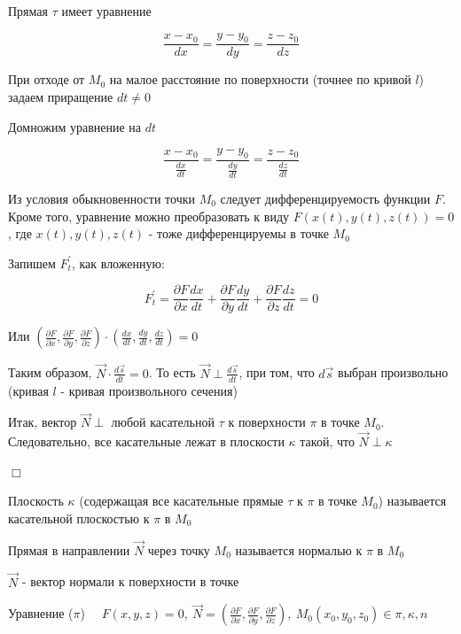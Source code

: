 \documentclass[12pt]{article}
\begin{document}
    Прямая $\tau$ имеет уравнение

    \[\frac{x - x_0}{dx} = \frac{y - y_0}{dy} = \frac{z - z_0}{dz}\]

    При отходе от $M_0$ на малое расстояние по поверхности (точнее по кривой $l$) задаем приращение $dt \neq 0$

    Домножим уравнение на $dt$

    \[\frac{x - x_0}{\frac{dx}{dt}} = \frac{y - y_0}{\frac{dy}{dt}} = \frac{z - z_0}{\frac{dz}{dt}}\]

    Из условия обыкновенности точки $M_0$ следует дифференцируемость функции $F$.
    Кроме того, уравнение можно преобразовать к виду $F(x(t), y(t), z(t)) = 0$, где $x(t), y(t), z(t)$ - тоже дифференцируемы в точке $M_0$

    Запишем $F^\prime_t$, как вложенную:

    \[F^\prime_t = \frac{\partial F}{\partial x}\frac{dx}{dt} + \frac{\partial F}{\partial y}\frac{dy}{dt} + \frac{\partial F}{\partial z}\frac{dz}{dt} = 0\]

    Или $\left(\frac{\partial F}{\partial x}, \frac{\partial F}{\partial y}, \frac{\partial F}{\partial z}\right) \cdot \left(\frac{dx}{dt}, \frac{dy}{dt}, \frac{dz}{dt}\right) = 0$

    Таким образом, $\overrightarrow{N} \cdot \frac{d\overrightarrow{s}}{dt} = 0$. То есть $\overrightarrow{N} \perp \frac{d\overrightarrow{s}}{dt}$, при том, что $d\overrightarrow{s}$ выбран произвольно (кривая $l$ - кривая произвольного сечения)

    Итак, вектор $\overrightarrow{N} \perp$ любой касательной $\tau$ к поверхности $\pi$ в точке $M_0$.
    Следовательно, все касательные лежат в плоскости $\kappa$ такой, что $\overrightarrow{N} \perp \kappa$

    $\Box$

    \hypertarget{tangentplanetosurface}{}

    \Def Плоскость $\kappa$ (содержащая все касательные прямые $\tau$ к $\pi$ в точке $M_0$) называется касательной плоскостью к $\pi$ в $M_0$

    \Def Прямая в направлении $\overrightarrow{N}$ через точку $M_0$ называется нормалью к $\pi$ в $M_0$

    $\overrightarrow{N}$ - вектор нормали к поверхности в точке

    Уравнение ($\pi$) $\quad F(x, y, z) = 0, \ \overrightarrow{N} = \left(\frac{\partial F}{\partial x}, \frac{\partial F}{\partial y}, \frac{\partial F}{\partial z}\right), \ M_0(x_0, y_0, z_0) \in \pi, \kappa, n$
\end{document}
